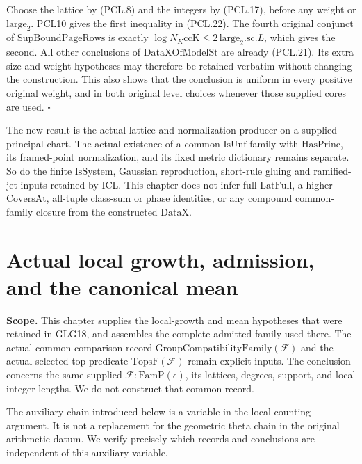 \documentclass[11pt,a4paper]{article}
\numberwithin{equation}{section}
\theoremstyle{remark}\newtheorem{remark}[theorem]{Remark}
\begin{document}
Choose the lattice by (PCL.8) and the integers by
(PCL.17), before any weight or \(\mathrm{large}_2\).
PCL10 gives the first inequality in (PCL.22).
The fourth original conjunct of
\(\mathrm{SupBoundPageRows}\) is exactly
\(\log N_K\mathrm{ccK}\le2\,\mathrm{large}_2.\mathrm{sc}.L\),
which gives the second.  All other conclusions of
\(\mathrm{DataXOfModelSt}\) are already (PCL.21).
Its extra size and weight hypotheses may therefore
be retained verbatim without changing the construction.
This also shows that the conclusion is uniform in
every positive original weight, and in both original
level choices whenever those supplied cores are used.
\hfill\(\square\)

The new result is the actual lattice and normalization
producer on a supplied principal chart.  The actual
existence of a common \(\mathrm{IsUnf}\) family with
\(\mathrm{HasPrinc}\), its framed-point normalization,
and its fixed metric dictionary remains separate.
So do the finite \(\mathrm{IsSystem}\), Gaussian
reproduction, short-rule gluing and ramified-jet inputs
retained by ICL.  This chapter does not infer full
\(\mathrm{LatFull}\), a higher \(\mathrm{CoversAt}\),
all-tuple class-sum or phase identities, or any compound
common-family closure from the constructed \(\mathrm{DataX}\).


\section{Actual local growth, admission, and the canonical mean}
\label{sec:local-growth-suppliers-v047}

\noindent\textbf{Scope.}
This chapter supplies the local-growth and mean hypotheses that were
retained in GLG18, and assembles the complete admitted family used
there.  The actual common comparison record
\(\mathrm{GroupCompatibilityFamily}(\mathcal F)\) and the actual
selected-top predicate \(\mathrm{TopsF}(\mathcal F)\) remain explicit
inputs.  The conclusion concerns the same supplied
\(\mathcal F:\mathrm{FamP}(\epsilon)\), its lattices, degrees, support,
and local integer lengths.  We do not construct that common record.

The auxiliary chain introduced below is a variable in the local
counting argument.  It is not a replacement for the geometric theta
chain in the original arithmetic datum.  We verify precisely which
records and conclusions are independent of this auxiliary variable.
\end{document}
